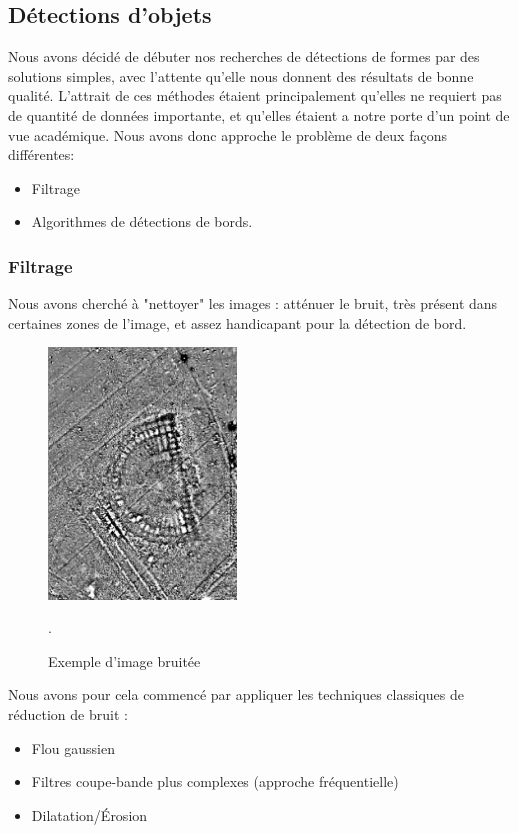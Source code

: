 \documentclass[a4paper, 12pt, titlepage, oneside, french]{article}
\begin{document}
	\newpage
	\subsection{Détections d'objets}
	Nous avons décidé de débuter nos recherches de détections de formes par des solutions simples, avec l'attente qu'elle nous donnent des résultats de bonne qualité. L'attrait de ces méthodes étaient principalement qu'elles ne requiert pas de quantité de données importante, et qu'elles étaient a notre porte d'un point de vue académique. Nous avons donc approche le problème de deux façons différentes:
	\begin{itemize}
		\item Filtrage
		\item Algorithmes de détections de bords.
	\end{itemize}
	\subsubsection{Filtrage}
	Nous avons cherché à "nettoyer" les images : atténuer le bruit, très présent dans certaines zones de l'image, et assez handicapant pour la détection de bord.
	\begin{figure}[H]
		\centering
		\includegraphics[width=5cm]{filter_input.png}
		\caption{Exemple d'image bruitée}. 
		\label{fig:FilterInput}
	\end{figure}
	Nous avons pour cela commencé par appliquer les techniques classiques de réduction de bruit : 
	\begin{itemize}
		\item Flou gaussien
		\item Filtres coupe-bande plus complexes (approche fréquentielle)
		\item Dilatation/Érosion
	\end{itemize}
	\newpage
\end{document}
